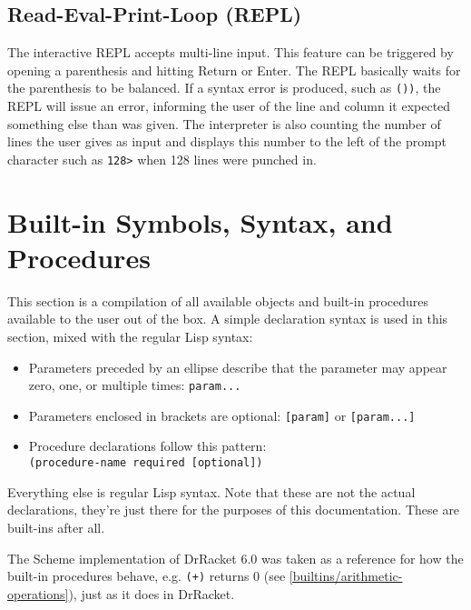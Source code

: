 \documentclass[a4paper]{scrartcl}
\newcommand{\lisp}{Lisp}
\begin{document}
\subsection{Read-Eval-Print-Loop (REPL)}
\label{usage/repl}
	The interactive REPL accepts multi-line input. This feature can be triggered by opening a parenthesis and hitting Return or Enter. The REPL basically waits for the parenthesis to be balanced. If a syntax error is produced, such as \lstinline|())|, the REPL will issue an error, informing the user of the line and column it expected something else than was given. The interpreter is also counting the number of lines the user gives as input and displays this number to the left of the prompt character such as \lstinline|128>| when 128 lines were punched in.

\section{Built-in Symbols, Syntax, and Procedures}
\label{builtins}
	This section is a compilation of all available objects and built-in procedures available to the user out of the box. A simple declaration syntax is used in this section, mixed with the regular \lisp{} syntax:

	\begin{itemize}
		\item Parameters preceded by an ellipse describe that the parameter may appear zero, one, or multiple times: \lstinline|param...|
		\item Parameters enclosed in brackets are optional: \lstinline|[param]| or \lstinline|[param...]|
		\item Procedure declarations follow this pattern:\\
			  \lstinline|(procedure-name required [optional])|
	\end{itemize}

	Everything else is regular \lisp{} syntax. Note that these are not the actual declarations, they're just there for the purposes of this documentation. These are built-ins after all.

	The Scheme implementation of DrRacket 6.0 was taken as a reference for how the built-in procedures behave, e.g. \lstinline|(+)| returns 0 (see \ref{builtins/arithmetic-operations}), just as it does in DrRacket.

	

	
	
	
	
	
	
	
	

	
	
	
	
	
	
	
	
	
	
	
	
	
	
	
	
	
	
\end{document}
